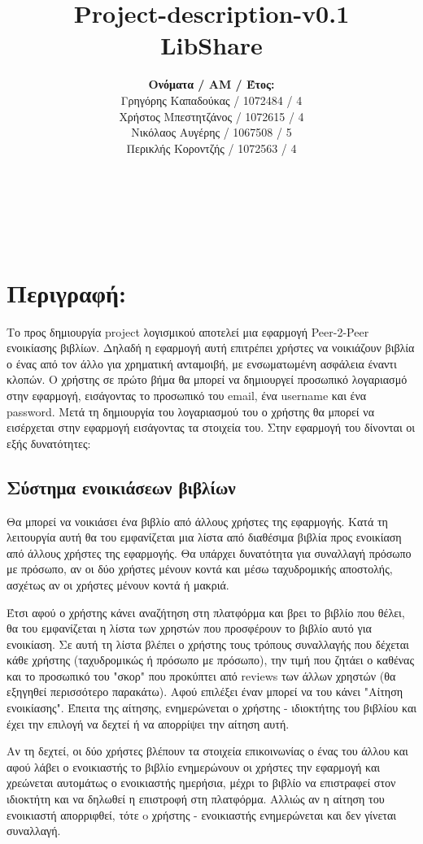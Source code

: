 \documentclass[12pt,a4paper]{article}
\title{Project-description-v0.1 \\ LibShare}
\author{\textbf{Ονόματα / ΑΜ / Έτος:} \\ Γρηγόρης Καπαδούκας / 1072484 / 4\textdegree \\ Χρήστος Μπεστητζάνος / 1072615 / 4\textdegree \\ Νικόλαος Αυγέρης / 1067508 / 5\textdegree \\ Περικλής Κοροντζής / 1072563 / 4\textdegree}
\begin{document}
\makeatletter
\begin{center}
	\LARGE{\@title} \\
	\pagebreak
	\begin{LARGE}\@author\end{LARGE} \\
\end{center}
\pagebreak

\section{Περιγραφή:}
\label{Περιγραφή}
Το προς δημιουργία project λογισμικού αποτελεί μια εφαρμογή Peer-2-Peer ενοικίασης βιβλίων. Δηλαδή η εφαρμογή αυτή επιτρέπει χρήστες να νοικιάζουν βιβλία ο ένας από τον άλλο για χρηματική ανταμοιβή, με ενσωματωμένη ασφάλεια έναντι κλοπών. Ο χρήστης σε πρώτο βήμα θα μπορεί να δημιουργεί προσωπικό λογαριασμό στην εφαρμογή, εισάγοντας το προσωπικό του email, ένα username και ένα password. Μετά τη δημιουργία του λογαριασμού του ο χρήστης θα μπορεί να εισέρχεται στην εφαρμογή εισάγοντας τα στοιχεία του. Στην εφαρμογή του δίνονται οι εξής δυνατότητες:

\subsection{Σύστημα ενοικιάσεων βιβλίων}
Θα μπορεί να νοικιάσει ένα βιβλίο από άλλους χρήστες της εφαρμογής. Κατά τη λειτουργία αυτή θα του εμφανίζεται μια λίστα από διαθέσιμα βιβλία προς ενοικίαση από άλλους χρήστες της εφαρμογής. Θα υπάρχει δυνατότητα για συναλλαγή πρόσωπο με πρόσωπο, αν οι δύο χρήστες μένουν κοντά και μέσω ταχυδρομικής αποστολής, ασχέτως αν οι χρήστες μένουν κοντά ή μακριά.

Έτσι αφού ο χρήστης κάνει αναζήτηση στη πλατφόρμα και βρει το βιβλίο που θέλει, θα του εμφανίζεται η λίστα των χρηστών που προσφέρουν το βιβλίο αυτό για ενοικίαση. Σε αυτή τη λίστα βλέπει ο χρήστης τους τρόπους συναλλαγής που δέχεται κάθε χρήστης (ταχυδρομικώς ή πρόσωπο με πρόσωπο), την τιμή που ζητάει ο καθένας και το προσωπικό του "σκορ" που προκύπτει από reviews των άλλων χρηστών (θα εξηγηθεί περισσότερο παρακάτω). Αφού επιλέξει έναν μπορεί να του κάνει "Αίτηση ενοικίασης". Έπειτα της αίτησης, ενημερώνεται ο χρήστης - ιδιοκτήτης του βιβλίου και έχει την επιλογή να δεχτεί ή να απορρίψει την αίτηση αυτή.

Αν τη δεχτεί, οι δύο χρήστες βλέπουν τα στοιχεία επικοινωνίας ο ένας του άλλου και αφού λάβει ο ενοικιαστής το βιβλίο ενημερώνουν οι χρήστες την εφαρμογή και χρεώνεται αυτομάτως ο ενοικιαστής ημερήσια, μέχρι το βιβλίο να επιστραφεί στον ιδιοκτήτη και να δηλωθεί η επιστροφή στη πλατφόρμα. 
Αλλιώς αν η αίτηση του ενοικιαστή απορριφθεί, τότε o χρήστης - ενοικιαστής ενημερώνεται και δεν γίνεται συναλλαγή.
\end{document}
